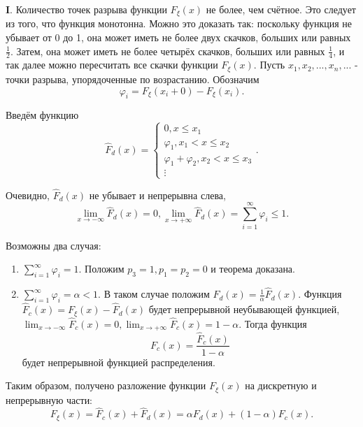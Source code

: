 \documentclass[oneside,final,14pt]{extreport}
\theoremstyle{definition}
\begin{document}
\textbf{I}. Количество точек разрыва функции $F_\xi(x)$ не более, чем счётное. Это следует из того, что функция монотонна. Можно это доказать так: поскольку функция не убывает от 0 до 1, она может иметь не более двух скачков, больших или равных $\frac{1}{2}$. Затем, она может иметь не более четырёх скачков, больших или равных $\frac{1}{4}$, и так далее можно пересчитать все скачки функции $F_\xi(x).$ Пусть $x_1, x_2, ..., x_n, ... $ - точки разрыва, упорядоченные по возрастанию. Обозначим 
$$\varphi_{i}=F_{\xi}\left(x_{i}+0\right)-F_{\xi}\left(x_{i}\right).$$

Введём функцию
$$\hat{F}_{d}(x)=\left\{\begin{array}{c}
0, x \leq x_{1} \\
\varphi_{1}, x_{1}<x \leq x_{2} \\
\varphi_{1}+\varphi_{2}, x_{2}<x \leq x_{3} \\
\vdots
\end{array}\right..$$

Очевидно, $\hat{F}_d(x)$  не убывает и непрерывна слева, $$\lim\limits_{x \rightarrow -\infty} \hat{F}_d(x) = 0, \lim\limits_{x \rightarrow +\infty} \hat{F}_d(x) = \sum\limits_{i=1}^\infty \varphi_i \leq 1.$$

Возможны два случая:
\begin{enumerate}
    \item $\sum\limits_{i=1}^\infty \varphi_i = 1.$ Положим $p_3 = 1, p_1 = p_2 = 0$ и теорема доказана.
    \item $\sum\limits_{i=1}^\infty \varphi_i = \alpha < 1.$ В таком случае положим $F_{d}(x)=\frac{1}{\alpha} \hat{F}_{d}(x)$. Функция $\hat{F}_{c}(x)=F_{\xi}(x)-\hat{F}_{d}(x)$ будет непрерывной неубывающей функцией, $\lim _{x \rightarrow-\infty} \hat{F}_{c}(x)=0, \lim _{x \rightarrow+\infty} \hat{F}_{c}(x)=1-\alpha$. Тогда функция $$F_{c}(x)=\frac{\hat{F}_{c}(x)}{1-\alpha}$$ будет непрерывной функцией распределения.
\end{enumerate}

Таким образом, получено разложение функции $F_\xi(x)$ на дискретную и непрерывную части: 
$$F_{\xi}(x)=\hat{F}_{c}(x)+\hat{F}_{d}(x)=\alpha F_{d}(x)+(1-\alpha) F_{c}(x).$$
\end{document}
